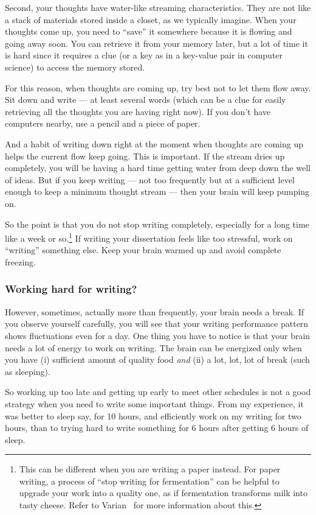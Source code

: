 \documentclass[11pt]{article}
\begin{document}
Second, your thoughts have water-like streaming characteristics.  They are not
like a stack of materials stored inside a closet, as we typically imagine.
When your thoughts come up, you need to ``save'' it somewhere because it is
flowing and going away soon. You can retrieve it from your memory later, but a
lot of time it is hard since it requires a clue (or a key as in a key-value
pair in computer science) to access the memory stored.

For this reason, when thoughts are coming up, try best not to let them flow
away. Sit down and write --- at least several words (which can be a clue for
easily retrieving all the thoughts you are having right now). If you don't
have computers nearby, use a pencil and a piece of paper. 

And a habit of writing down right at the moment when thoughts are coming up
helps the current flow keep going. This is important. If the stream dries up
completely, you will be having a hard time getting water from deep down the
well of ideas.  But if you keep writing --- not too frequently but at a
sufficient level enough to keep a minimum thought stream --- then your brain
will keep pumping on.

So the point is that you do not stop writing completely, especially for a long
time like a week or so.\footnote{This can be different when you are writing a
paper instead. For paper writing, a process of ``stop writing for
fermentation'' can be helpful to upgrade your work into a quality one, as if
fermentation transforms milk into tasty cheese. Refer to
Varian~\cite{varian-building-model} for more information about this.} If
writing your dissertation feels like too stressful, work on ``writing''
something else. Keep your brain warmed up and avoid complete freezing. 

\subsubsection{Working hard for writing?}

However, sometimes, actually more than frequently, your brain needs a break.
If you observe yourself carefully, you will see that your writing performance
pattern shows fluctuations even for a day. One thing you have to notice is
that your brain needs a lot of energy to work on writing. The brain can be
energized only when you have (i) sufficient amount of quality food \emph{and}
(ii) a lot, lot, lot of break (such as sleeping). 

So working up too late and getting up early to meet other schedules is not a
good strategy when you need to write some important things. From my
experience, it was better to sleep say, for 10 hours, and efficiently work on
my writing for two hours, than to trying hard to write something for 6 hours
after getting 6 hours of sleep. 
\end{document}
